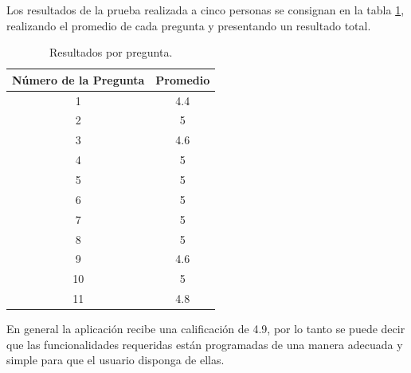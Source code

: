 Los resultados de la prueba realizada a cinco personas se consignan en la tabla \ref{table:enc}, realizando el promedio de cada pregunta y presentando un resultado total.

\begin{table}[H]
	\begin{center}
		\caption{Resultados por pregunta.}
		\label{table:enc}
		\begin{tabular}{|c|c|}
			\hline 
			Número de la Pregunta & Promedio \\ 
			\hline 
			1 & 4.4\\ 
			\hline 
			2 & 5\\ 
			\hline 
			3 & 4.6\\ 
			\hline 
			4 & 5\\ 
			\hline 
			5 & 5\\ 
			\hline 
			6 & 5\\ 
			\hline 
			7 & 5\\ 
			\hline 
			8 & 5\\ 
			\hline 
			9 & 4.6\\ 
			\hline 
			10 & 5\\ 
			\hline 
			11 & 4.8\\ 
			\hline 
		\end{tabular} 
	\end{center}
\end{table}

En general la aplicación recibe una calificación de 4.9, por lo tanto se puede decir que las funcionalidades requeridas están programadas de una manera adecuada y simple para que el usuario disponga de ellas.